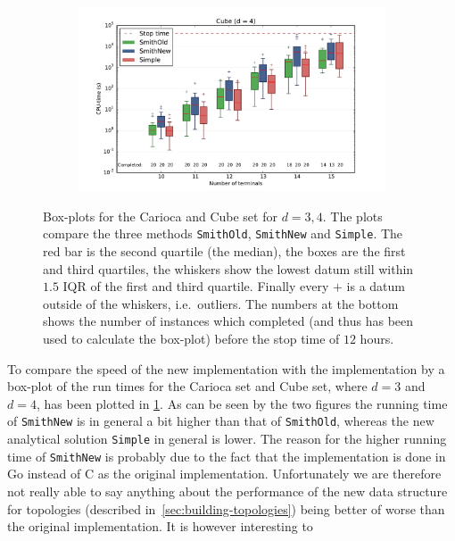 \begin{figure}[htbp]
\begin{subfigure}[t]{0.5\textwidth}
  \end{subfigure}%
  \begin{subfigure}[t]{0.5\textwidth}
    \includegraphics[width=\textwidth]{gfx/boxplots/plot_nvst_boxplot_d4_Cube_1}
  \end{subfigure}%
  \caption[Box-plots: \texttt{SmithOld} vs.\ \texttt{SmithNew} vs.\
  \texttt{Simple}]{Box-plots for the Carioca and Cube set for $d = 3, 4$. The
    plots compare the three methods \texttt{SmithOld}, \texttt{SmithNew} and
    \texttt{Simple}. The red bar is the second quartile (the median), the boxes
    are the first and third quartiles, the whiskers show the lowest datum still
    within $1.5$ IQR of the first and third quartile. Finally every $+$ is a datum
    outside of the whiskers, i.e.\ outliers. The numbers at the bottom shows the
    number of instances which completed (and thus has been used to calculate the
    box-plot) before the stop time of $12$ hours.\label{fig:boxplots-1}}
\end{figure}
%
To compare the speed of the new implementation with the implementation by
\textcite{smith1992} a box-plot of the run times for the Carioca set and Cube
set, where $d = 3$ and $d = 4$, has been plotted in \cref{fig:boxplots-1}. As
can be seen by the two figures the running time of \texttt{SmithNew} is in
general a bit higher than that of \texttt{SmithOld}, whereas the new analytical
solution \texttt{Simple} in general is lower. The reason for the higher running
time of \texttt{SmithNew} is probably due to the fact that the implementation is
done in Go instead of C as the original implementation. Unfortunately we are
therefore not really able to say anything about the performance of the new data
structure for topologies (described in~\cref{sec:building-topologies}) being
better of worse than the original implementation. It is however interesting to
